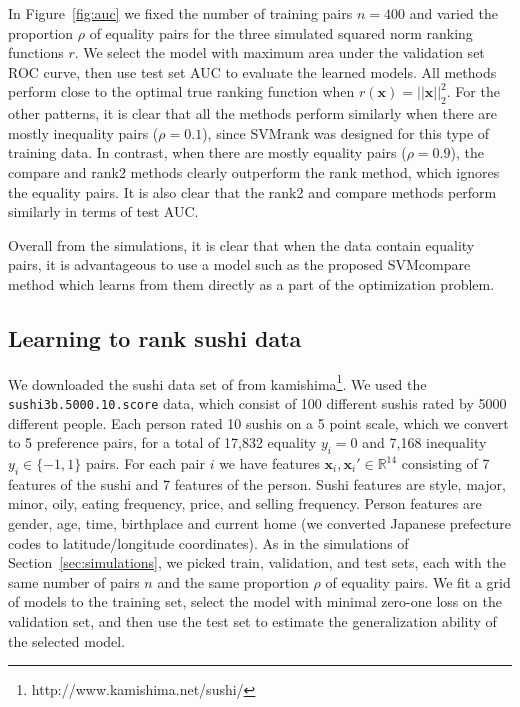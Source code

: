 \documentclass[twoside,11pt]{article}
\newcommand{\changed}[1]{
  #1
}
\newcommand{\RR}{\mathbb R}
\begin{document}
In Figure~\ref{fig:auc} we fixed the number of training pairs $n=400$
and varied the proportion $\rho$ of equality pairs for the three
simulated squared norm ranking functions $r$. We select the model with
maximum area under the validation set ROC curve, then use test set AUC
to evaluate the learned models. All methods perform close to the
optimal true ranking function when $r(\mathbf x)=||\mathbf
x||^2_2$. For the other patterns, it is clear that all the methods
perform similarly when there are mostly inequality pairs ($\rho=0.1$),
since SVMrank was designed for this type of training data. In
contrast, when there are mostly equality pairs ($\rho=0.9$), the
compare and rank2 methods clearly outperform the rank method, which
ignores the equality pairs. \changed{It is also clear that the rank2 and
compare methods perform similarly in terms of test AUC.}

\changed{Overall from the simulations, it is clear that when the data contain
equality pairs, it is advantageous to use a model such as the proposed
SVMcompare method which learns from them directly as a part of the
optimization problem.}

\subsection{Learning to rank sushi data}

We downloaded the sushi data set of \citet{object-ranking-methods}
from kamishima\footnote{http://www.kamishima.net/sushi/}. We used the
\texttt{sushi3b.5000.10.score} data, which consist of 100 different
sushis rated by 5000 different people. Each person rated 10 sushis on
a 5 point scale, which we convert to 5 preference pairs, for a total
of 17,832 equality $y_i=0$ and 7,168 inequality $y_i\in\{-1,1\}$
pairs. For each pair $i$ we have features $\mathbf x_i,\mathbf
x_i'\in\RR^{14}$ consisting of 7 features of the sushi and 7 features
of the person. Sushi features are style, major, minor, oily, eating
frequency, price, and selling frequency. Person features are gender, age,
time, birthplace and current home (we converted Japanese prefecture
codes to latitude/longitude coordinates).
As in the simulations of Section~\ref{sec:simulations}, we picked
train, validation, and test sets, each with the same number of pairs
$n$ and the same proportion $\rho$ of equality pairs. We fit a grid of
models to the training set, select the model with
minimal zero-one loss on the validation set, and then use the test set
to estimate the generalization ability of the selected model.
\end{document}
